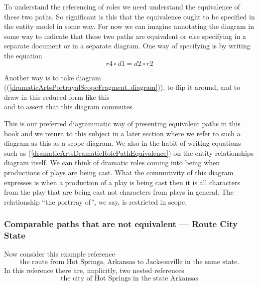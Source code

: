 To understand the referencing of roles we need understand the equivalence of these two paths. 
So significant is this that the equivalence ought to be specified in the entity model in some way.
For now we can imagine annotating the diagram in some way to indicate that these two paths are equivalent 
or else specifying in a separate document or in a separate diagram. 
One way of specifying is by writing the equation
\begin{equation}
\label{dramaticArtsDramaticRolePathEquivalence}
r4 \circ d1 = d2 \circ r2
\end{equation}

Another way is to take diagram ((\ref{dramaticArtsPortrayalScopeFragment..diagram})), 
to flip it  around, and to draw  in this reduced form like this
\begin{equation}
\label{dramaticArtsPortrayalScopeAppearance1}

\end{equation}
and to assert that this diagram commutes.

This is our preferred diagrammatic way of presenting equivalent paths in this book and we return to this subject in a later section where we refer to such a diagram as this as a scope diagram. 
We also in the habit of writing equations such as (\ref{dramaticArtsDramaticRolePathEquivalence}) on the entity relationships diagram itself.
We can think of dramatic roles coming into being when productions of plays are being cast. What the commutivity of this diagram expresses is when a production of a play is being cast then it is all characters from the play that are being cast not characters from plays in general. 
The relationship ``the portrray of'', we say, is restricted in scope.

\subsubsection {Comparable paths that are not equivalent --- Route City State}
\mynote {}
Now consider this example reference
\begin{equation}
\mbox{the route from Hot Springs, Arkansas to Jacksonville in the same state.}
\end{equation}
In this reference there are, implicitly, two nested references
\begin{equation}
\mbox{the city of Hot Springs in the state  Arkansas}
\end{equation}

